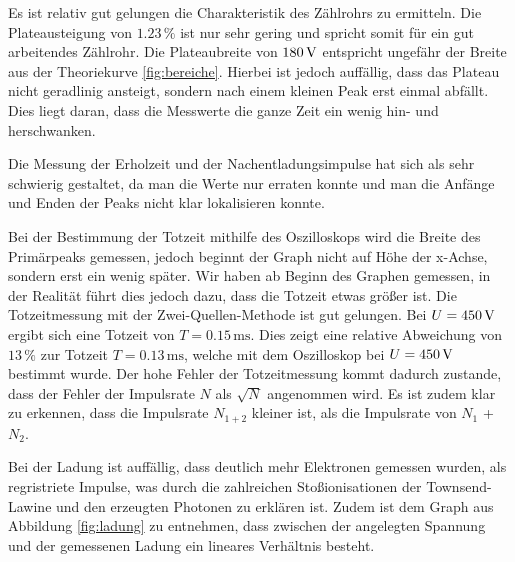Es ist relativ gut gelungen die Charakteristik des Zählrohrs zu ermitteln.
Die Plateausteigung von $1.23\,\%$ ist nur sehr gering und spricht somit für
ein gut arbeitendes Zählrohr. Die Plateaubreite von $180\,\si{\volt}$ entspricht
ungefähr der Breite aus der Theoriekurve \ref{fig:bereiche}. Hierbei
ist jedoch auffällig, dass das Plateau nicht geradlinig ansteigt, sondern
nach einem kleinen Peak erst einmal abfällt. Dies liegt daran, dass die
Messwerte die ganze Zeit ein wenig hin- und herschwanken.

Die Messung der Erholzeit und der Nachentladungsimpulse hat sich als sehr
schwierig gestaltet, da man die Werte nur erraten konnte und man die
Anfänge und Enden der Peaks nicht klar lokalisieren konnte.

Bei der Bestimmung der Totzeit mithilfe des Oszilloskops wird die Breite des Primärpeaks gemessen, jedoch beginnt der Graph nicht auf Höhe der x-Achse, sondern erst ein wenig
später. Wir haben ab Beginn des Graphen gemessen, in der Realität führt
dies jedoch dazu, dass die Totzeit etwas größer ist.
Die Totzeitmessung mit der Zwei-Quellen-Methode ist gut gelungen. Bei
$U=450\,\si{\volt}$ ergibt sich eine Totzeit von $T=0.15\,\si{\milli\second}$.
Dies zeigt eine relative Abweichung von $13\,\%$ zur Totzeit $T=0.13\,\si{\milli\second}$, welche mit
dem Oszilloskop bei $U=450\,\si{\volt}$ bestimmt wurde. Der hohe Fehler der
Totzeitmessung kommt dadurch zustande, dass der Fehler der Impulsrate $N$
als $\sqrt{N}$ angenommen wird.
Es ist zudem klar zu erkennen, dass die Impulsrate $N_{1+2}$ kleiner ist, als die Impulsrate von $N_1$ + $N_2$.

Bei der Ladung ist auffällig, dass deutlich mehr Elektronen gemessen wurden,
als regristriete Impulse, was durch die zahlreichen Stoßionisationen
der Townsend-Lawine und den erzeugten Photonen zu erklären ist. Zudem ist
dem Graph aus Abbildung \ref{fig:ladung} zu entnehmen, dass zwischen
der angelegten Spannung und der gemessenen Ladung ein lineares Verhältnis
besteht.
